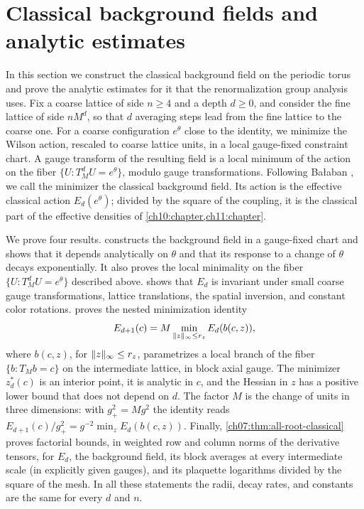 \chapter{Classical background fields and analytic estimates}\label{ch07:chapter}

In this section we construct the classical background field on the periodic torus and prove the analytic estimates for it that the renormalization group analysis uses. Fix a coarse lattice of side $n\ge4$ and a depth $d\ge0$, and consider the fine lattice of side $nM^d$, so that $d$ averaging steps lead from the fine lattice to the coarse one. For a coarse configuration $e^\theta$ close to the identity, we minimize the Wilson action, rescaled to coarse lattice units, in a local gauge-fixed constraint chart. A gauge transform of the resulting field is a local minimum of the action on the fiber $\{U:T_M^dU=e^\theta\}$, modulo gauge transformations. Following Ba{\l}aban \cite{Balaban1985Variational}, we call the minimizer the classical background field. Its action is the effective classical action $E_d(e^\theta)$; divided by the square of the coupling, it is the classical part of the effective densities of \cref{ch10:chapter,ch11:chapter}.

We prove four results.  constructs the background field in a gauge-fixed chart and shows that it depends analytically on $\theta$ and that its response to a change of $\theta$ decays exponentially. It also proves the local minimality on the fiber $\{U:T_M^dU=e^\theta\}$ described above.  shows that $E_d$ is invariant under small coarse gauge transformations, lattice translations, the spatial inversion, and constant color rotations.  proves the nested minimization identity
\[
 E_{d+1}(c)=M\min_{\lVert z\rVert_\infty\le r_z}E_d(b(c,z)),
\]
where $b(c,z)$, for $\lVert z\rVert_\infty\le r_z$, parametrizes a local branch of the fiber $\{b:T_Mb=c\}$ on the intermediate lattice, in block axial gauge. The minimizer $z^*_d(c)$ is an interior point, it is analytic in $c$, and the Hessian in $z$ has a positive lower bound that does not depend on $d$. The factor $M$ is the change of units in three dimensions: with $g_+^2=Mg^2$ the identity reads $E_{d+1}(c)/g_+^2=g^{-2}\min_zE_d(b(c,z))$. Finally, \cref{ch07:thm:all-root-classical} proves factorial bounds, in weighted row and column norms of the derivative tensors, for $E_d$, the background field, its block averages at every intermediate scale (in explicitly given gauges), and its plaquette logarithms divided by the square of the mesh. In all these statements the radii, decay rates, and constants are the same for every $d$ and $n$.

